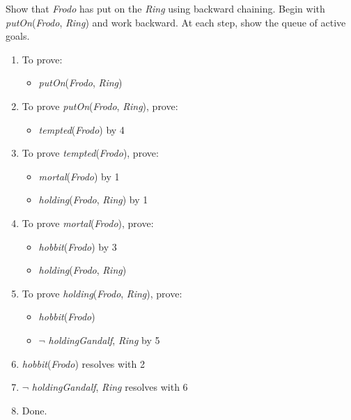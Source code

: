 \documentclass[paper=a4, fontsize=11pt]{scrartcl} %
\begin{document}
\begin{fancyquotes}
  Show that \textit{Frodo} has put on the \textit{Ring} using backward
  chaining. Begin with \textit{putOn}(\textit{Frodo}, \textit{Ring})
  and work backward. At each step, show the queue of active goals.
\end{fancyquotes}

\begin{enumerate}
\item To prove:
  \begin{itemize}
  \item \textit{putOn}(\textit{Frodo}, \textit{Ring})
  \end{itemize}
\item To prove \textit{putOn}(\textit{Frodo}, \textit{Ring}), prove:
  \begin{itemize}
  \item \textit{tempted}(\textit{Frodo}) by 4
  \end{itemize}
\item To prove \textit{tempted}(\textit{Frodo}), prove:
  \begin{itemize}
  \item \textit{mortal}(\textit{Frodo}) by 1
  \item \textit{holding}(\textit{Frodo}, \textit{Ring}) by 1
  \end{itemize}
\item To prove \textit{mortal}(\textit{Frodo}), prove:
  \begin{itemize}
  \item \textit{hobbit}(\textit{Frodo}) by 3
  \item \textit{holding}(\textit{Frodo}, \textit{Ring})
  \end{itemize}
\item To prove \textit{holding}(\textit{Frodo}, \textit{Ring}), prove:
  \begin{itemize}
  \item \textit{hobbit}(\textit{Frodo})
  \item $\lnot$ \textit{holding}{\textit{Gandalf}, \textit{Ring}} by 5
  \end{itemize}
\item \textit{hobbit}(\textit{Frodo}) resolves with 2
\item $\lnot$ \textit{holding}{\textit{Gandalf}, \textit{Ring}}
  resolves with 6
\item Done.
\end{enumerate}

\end{document}
